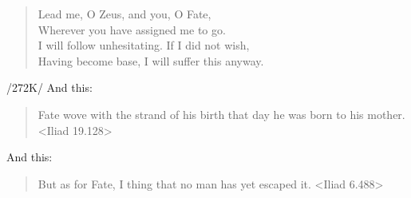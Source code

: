\begin{verse}
Lead me, O Zeus, and you, O Fate, \\
Wherever you have assigned me to go. \\
I will follow unhesitating. If I did not wish,  \\
Having become base, I will suffer this anyway. \\
\end{verse}

/272K/ And this:
\begin{verse}
Fate wove with the strand of his birth that day he was born to his mother. <Iliad 19.128>
\end{verse}

And this:
\begin{verse}
But as for Fate, I thing that no man has yet escaped it. <Iliad 6.488>
\end{verse}

\newpage